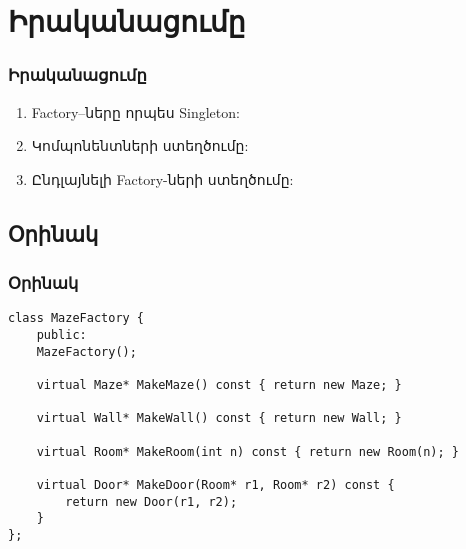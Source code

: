 \documentclass{beamer}
\begin{document}
\section{Իրականացումը}
\begin{frame}\frametitle{Իրականացումը}
\begin{enumerate}
    \item Factory–ները որպես Singleton: \pause \vfill
    \item Կոմպոնենտների ստեղծումը: \pause \vfill
    \item Ընդլայնելի Factory-ների ստեղծումը:
\end{enumerate}
\end{frame}

\subsection{Օրինակ}
\begin{frame}[fragile]\frametitle{Օրինակ}
\begin{english}
\begin{verbatim}
class MazeFactory {
    public:
    MazeFactory();

    virtual Maze* MakeMaze() const { return new Maze; }

    virtual Wall* MakeWall() const { return new Wall; }

    virtual Room* MakeRoom(int n) const { return new Room(n); }

    virtual Door* MakeDoor(Room* r1, Room* r2) const {
        return new Door(r1, r2);
    }
};
\end{verbatim}
\end{english}
\end{frame}
\end{document}
